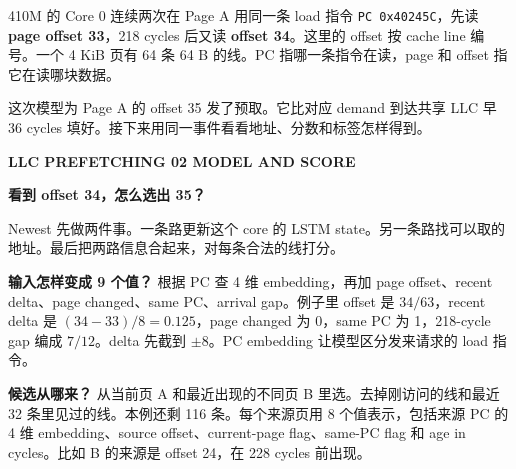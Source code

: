 \documentclass[10pt,letterpaper]{article}
\newcommand{\sectionline}[1]{{\small\bfseries\color{teal} LLC PREFETCHING \hfill #1}\par\vspace{4pt}}
\newcommand{\titleline}[1]{{\LARGE\bfseries #1}\par\vspace{6pt}}
\newcommand{\subhead}[1]{\vspace{5pt}{\large\bfseries #1}\par}
\newcommand{\callout}[1]{\par\noindent\colorbox{tint}{\parbox{\dimexpr\linewidth-2\fboxsep}{#1}}\par}
\begin{document}
\subhead{跟一条请求走到底}
410M 的 Core 0 连续两次在 Page A 用同一条 load 指令 \texttt{PC 0x40245C}，先读 \textbf{page offset 33}，218 cycles 后又读 \textbf{offset 34}。这里的 offset 按 cache line 编号。一个 4 KiB 页有 64 条 64 B 的线。PC 指哪一条指令在读，page 和 offset 指它在读哪块数据。

\callout{这次模型为 Page A 的 offset 35 发了预取。它比对应 demand 到达共享 LLC 早 36 cycles 填好。接下来用同一事件看看地址、分数和标签怎样得到。}

\newpage
\sectionline{02 \hfill MODEL AND SCORE}
\titleline{看到 offset 34，怎么选出 35？}
Newest 先做两件事。一条路更新这个 core 的 LSTM state。另一条路找可以取的地址。最后把两路信息合起来，对每条合法的线打分。

\par

\textbf{输入怎样变成 9 个值？} 根据 PC 查 4 维 embedding，再加 page offset、recent delta、page changed、same PC、arrival gap。例子里 offset 是 $34/63$，recent delta 是 $(34-33)/8=0.125$，page changed 为 0，same PC 为 1，218-cycle gap 编成 $7/12$。delta 先截到 $\pm8$。PC embedding 让模型区分发来请求的 load 指令。

\textbf{候选从哪来？} 从当前页 A 和最近出现的不同页 B 里选。去掉刚访问的线和最近 32 条里见过的线。本例还剩 116 条。每个来源页用 8 个值表示，包括来源 PC 的 4 维 embedding、source offset、current-page flag、same-PC flag 和 age in cycles。比如 B 的来源是 offset 24，在 228 cycles 前出现。
\end{document}
